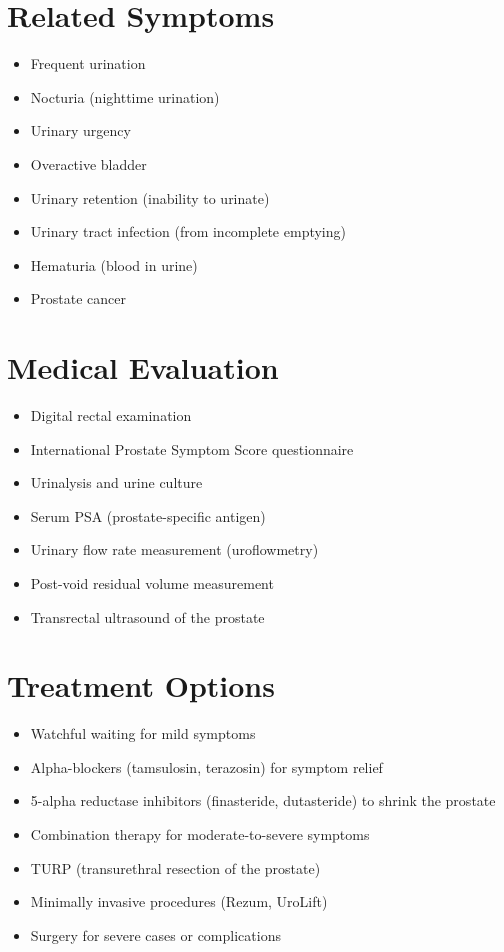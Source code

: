 \section*{Related Symptoms}
\begin{itemize}
\item Frequent urination
\item Nocturia (nighttime urination)
\item Urinary urgency
\item Overactive bladder
\item Urinary retention (inability to urinate)
\item Urinary tract infection (from incomplete emptying)
\item Hematuria (blood in urine)
\item Prostate cancer
\end{itemize}

\section*{Medical Evaluation}
\begin{itemize}
\item Digital rectal examination
\item International Prostate Symptom Score questionnaire
\item Urinalysis and urine culture
\item Serum PSA (prostate-specific antigen)
\item Urinary flow rate measurement (uroflowmetry)
\item Post-void residual volume measurement
\item Transrectal ultrasound of the prostate
\end{itemize}

\section*{Treatment Options}
\begin{itemize}
\item Watchful waiting for mild symptoms
\item Alpha-blockers (tamsulosin, terazosin) for symptom relief
\item 5-alpha reductase inhibitors (finasteride, dutasteride) to shrink the prostate
\item Combination therapy for moderate-to-severe symptoms
\item TURP (transurethral resection of the prostate)
\item Minimally invasive procedures (Rezum, UroLift)
\item Surgery for severe cases or complications
\end{itemize}
